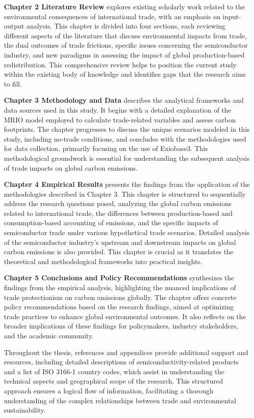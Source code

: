 \textbf{Chapter 2 Literature Review} explores existing scholarly work related to the environmental consequences of international trade, with an emphasis on input-output analysis. This chapter is divided into four sections, each reviewing different aspects of the literature that discuss environmental impacts from trade, the dual outcomes of trade frictions, specific issues concerning the semiconductor industry, and new paradigms in assessing the impact of global production-based redistribution. This comprehensive review helps to position the current study within the existing body of knowledge and identifies gaps that the research aims to fill.

\textbf{Chapter 3 Methodology and Data} describes the analytical frameworks and data sources used in this study. It begins with a detailed explanation of the MRIO model employed to calculate trade-related variables and assess carbon footprints. The chapter progresses to discuss the unique scenarios modeled in this study, including no-trade conditions, and concludes with the methodologies used for data collection, primarily focusing on the use of Exiobase3. This methodological groundwork is essential for understanding the subsequent analysis of trade impacts on global carbon emissions.

\textbf{Chapter 4 Empirical Results} presents the findings from the application of the methodologies described in Chapter 3. This chapter is structured to sequentially address the research questions posed, analyzing the global carbon emissions related to international trade, the differences between production-based and consumption-based accounting of emissions, and the specific impacts of semiconductor trade under various hypothetical trade scenarios. Detailed analysis of the semiconductor industry's upstream and downstream impacts on global carbon emissions is also provided. This chapter is crucial as it translates the theoretical and methodological frameworks into practical insights.

\textbf{Chapter 5 Conclusions and Policy Recommendations} synthesizes the findings from the empirical analysis, highlighting the nuanced implications of trade protectionism on carbon emissions globally. The chapter offers concrete policy recommendations based on the research findings, aimed at optimizing trade practices to enhance global environmental outcomes. It also reflects on the broader implications of these findings for policymakers, industry stakeholders, and the academic community.

Throughout the thesis, references and appendices provide additional support and resources, including detailed descriptions of semiconductivity-related products and a list of ISO 3166-1 country codes, which assist in understanding the technical aspects and geographical scope of the research. This structured approach ensures a logical flow of information, facilitating a thorough understanding of the complex relationships between trade and environmental sustainability.

